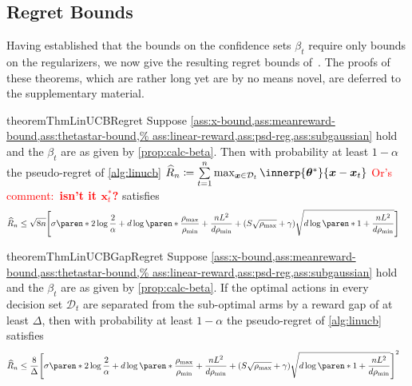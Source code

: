 \documentclass{article}
\newcommand{\os}[1]{\textcolor{red}{Or's comment:~\textbf{#1}}}
\renewcommand{\vec}[1]{\bm{#1}}
\newcommand{\defeq}{\coloneq}
\DeclarePairedDelimiter{\paren}()
\DeclarePairedDelimiter{\brck}{[}{]}
\newcommand{\Dset}[1]{\mathcal{D}_{#1}}
\begin{document}
\subsection{Regret Bounds}
\label{sec:regret-bounds}
Having established that the bounds on the confidence sets $\beta_t$ require only bounds on the regularizers, we now give the resulting regret bounds of~. The proofs of these theorems, which are rather long yet are by no means novel, are deferred to the supplementary material.
\begin{restatable}{theorem}{ThmLinUCBRegret}%
  \label{thm:linucb-regret}%
  Suppose \cref{ass:x-bound,ass:meanreward-bound,ass:thetastar-bound,%
    ass:linear-reward,ass:psd-reg,ass:subgaussian} hold and the
  $\beta_t$ are as given by \cref{prop:calc-beta}.  Then with
  probability at least $1-\alpha$ the pseudo-regret of
  \cref{alg:linucb}
    $\widehat R_n
    \defeq \sum\limits_{t=1}^n \max_{\vec x\in\Dset{t}} \innerp{\vec\theta^*}{\vec x - \vec x_t}$ \os{isn't it $\vec x_t^*$?} satisfies
    \begin{align}
    \label{eq:regret_general_formula}
    \widehat R_n
    &\le \sqrt{8n}\brck*{\sigma\paren*{2\log\frac{2}{\alpha}
      + d\log\paren*{\frac{\rho_{\max}}{\rho_{\min}} + \frac{nL^2}{d\rho_{\min}}}}
      + (S\sqrt{\rho_{\max}} + \gamma)\sqrt{d\log\paren*{1 + \frac{nL^2}{d\rho_{\min}}}}}
  \end{align}
\end{restatable}

\begin{restatable}{theorem}{ThmLinUCBGapRegret}%
  \label{thm:linucb-gap-regret}
  Suppose \cref{ass:x-bound,ass:meanreward-bound,ass:thetastar-bound,%
    ass:linear-reward,ass:psd-reg,ass:subgaussian} hold and the
  $\beta_t$ are as given by \cref{prop:calc-beta}.  If the optimal
  actions in every decision set $\Dset{t}$ are separated from the
  sub-optimal arms by a reward gap of at least $\Delta$, then with
  probability at least $1-\alpha$ the pseudo-regret of
  \cref{alg:linucb} satisfies
  \begin{align}
  \label{eq:regret_gap_general_formula}
    \widehat R_n
    &\le \frac{8}{\Delta} \brck*{\sigma\paren*{2\log\frac{2}{\alpha}
      + d\log\paren*{\frac{\rho_{\max}}{\rho_{\min}} + \frac{nL^2}{d\rho_{\min}}}}
      + (S\sqrt{\rho_{\max}}+\gamma)\sqrt{d\log\paren*{1+\frac{nL^2}{d\rho_{\min}}}}}^2
  \end{align}
\end{restatable}
\end{document}
